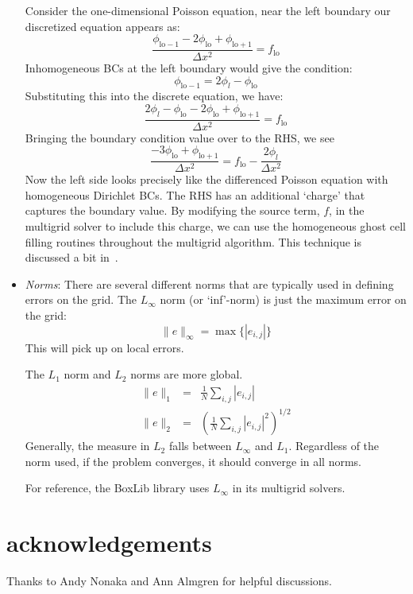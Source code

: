 \begin{itemize}
Consider the one-dimensional Poisson equation, near the left boundary
our discretized equation appears as:
\begin{equation}
\frac{\phi_\mathrm{lo-1} - 2\phi_\mathrm{lo} + \phi_\mathrm{lo+1}}{\Delta x^2}
 = f_\mathrm{lo}
\end{equation}
Inhomogeneous BCs at the left boundary would give the condition:
\begin{equation}
\phi_\mathrm{lo-1} = 2 \phi_l - \phi_\mathrm{lo}
\end{equation}
Substituting this into the discrete equation, we have:
\begin{equation}
\frac{2 \phi_l - \phi_\mathrm{lo} - 2\phi_\mathrm{lo} + \phi_\mathrm{lo+1}}{\Delta x^2}
 = f_\mathrm{lo}
\end{equation}
Bringing the boundary condition value over to the RHS, we see
\begin{equation}
\frac{- 3\phi_\mathrm{lo} + \phi_\mathrm{lo+1}}{\Delta x^2}
 = f_\mathrm{lo} - \frac{2\phi_l}{\Delta x^2}
\end{equation}
Now the left side looks precisely like the differenced Poisson equation
with homogeneous Dirichlet BCs.  The RHS has an additional `charge' that
captures the boundary value.  By modifying the source term, $f$, in the
multigrid solver to include this charge, we can use the homogeneous 
ghost cell filling routines throughout the multigrid algorithm.
This technique is discussed a bit in~\cite{colellanotes}.

\item {\em Norms}: There are several different norms that are typically
used in defining errors on the grid.  The $L_\infty$ norm (or `inf'-norm)
is just the maximum error on the grid:
\begin{equation}
\|e\|_\infty = \max \{ |e_{i,j}| \}
\end{equation}
This will pick up on local errors.  

The $L_1$ norm and $L_2$ norms are more global. 
\begin{eqnarray}
\|e\|_1 &=& \frac{1}{N} \sum_{i,j} |e_{i,j} | \\
\|e\|_2 &=& \left ( \frac{1}{N} \sum_{i,j} |e_{i,j} |^2 \right )^{1/2}
\end{eqnarray}
Generally, the measure in $L_2$ falls between $L_\infty$ and $L_1$.
Regardless of the norm used, if the problem converges, it should
converge in all norms.

For reference, the BoxLib library uses $L_\infty$ in its multigrid solvers.

\end{itemize}


\section*{acknowledgements}

Thanks to Andy Nonaka and Ann Almgren for helpful discussions.
